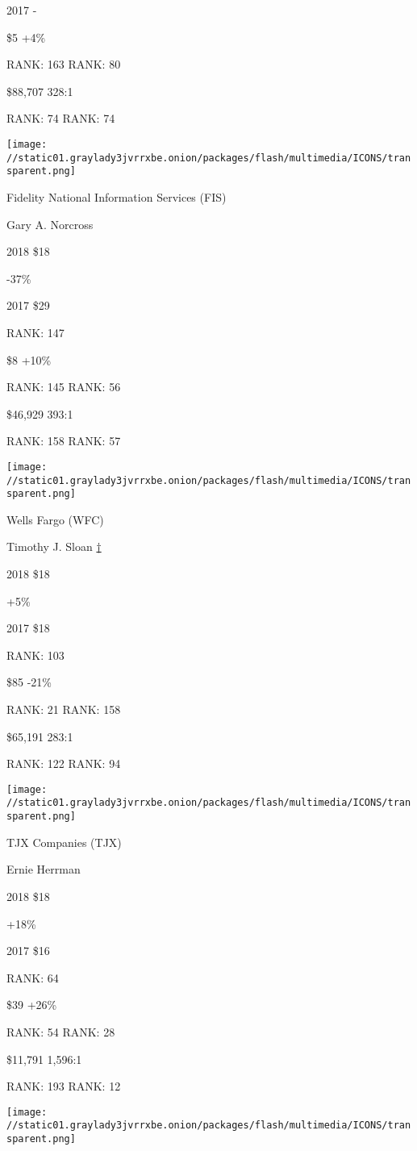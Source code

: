 2017 -

 \$5 +4\%

RANK: 163 RANK: 80

 \$88,707 328:1

RANK: 74 RANK: 74

\texttt{[image: //static01.graylady3jvrrxbe.onion/packages/flash/multimedia/ICONS/transparent.png]}

Fidelity National Information Services (FIS)

Gary A. Norcross \protect\hyperlink{g-footnotes}{}

2018 \$18

 -37\%

2017 \$29

RANK: 147

 \$8 +10\%

RANK: 145 RANK: 56

 \$46,929 393:1

RANK: 158 RANK: 57

\texttt{[image: //static01.graylady3jvrrxbe.onion/packages/flash/multimedia/ICONS/transparent.png]}

Wells Fargo (WFC)

Timothy J. Sloan \protect\hyperlink{g-footnotes}{†}

2018 \$18

 +5\%

2017 \$18

RANK: 103

 \$85 -21\%

RANK: 21 RANK: 158

 \$65,191 283:1

RANK: 122 RANK: 94

\texttt{[image: //static01.graylady3jvrrxbe.onion/packages/flash/multimedia/ICONS/transparent.png]}

TJX Companies (TJX)

Ernie Herrman \protect\hyperlink{g-footnotes}{}

2018 \$18

 +18\%

2017 \$16

RANK: 64

 \$39 +26\%

RANK: 54 RANK: 28

 \$11,791 1,596:1

RANK: 193 RANK: 12

\texttt{[image: //static01.graylady3jvrrxbe.onion/packages/flash/multimedia/ICONS/transparent.png]}

